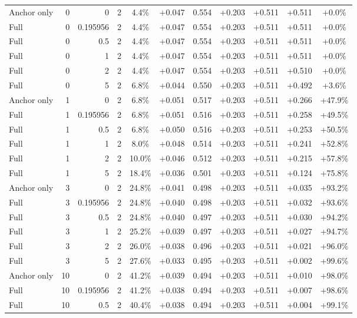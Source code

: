 \begin{table}[htbp]
\begin{tabular}{lrrrccccccc}
Anchor only & 0 & 0 & 2 & 4.4\% & +0.047 & 0.554 & +0.203 & +0.511 & +0.511 & +0.0\% \\
Full & 0 & 0.195956 & 2 & 4.4\% & +0.047 & 0.554 & +0.203 & +0.511 & +0.511 & +0.0\% \\
Full & 0 & 0.5 & 2 & 4.4\% & +0.047 & 0.554 & +0.203 & +0.511 & +0.511 & +0.0\% \\
Full & 0 & 1 & 2 & 4.4\% & +0.047 & 0.554 & +0.203 & +0.511 & +0.511 & +0.0\% \\
Full & 0 & 2 & 2 & 4.4\% & +0.047 & 0.554 & +0.203 & +0.511 & +0.510 & +0.0\% \\
Full & 0 & 5 & 2 & 6.8\% & +0.044 & 0.550 & +0.203 & +0.511 & +0.492 & +3.6\% \\
Anchor only & 1 & 0 & 2 & 6.8\% & +0.051 & 0.517 & +0.203 & +0.511 & +0.266 & +47.9\% \\
Full & 1 & 0.195956 & 2 & 6.8\% & +0.051 & 0.516 & +0.203 & +0.511 & +0.258 & +49.5\% \\
Full & 1 & 0.5 & 2 & 6.8\% & +0.050 & 0.516 & +0.203 & +0.511 & +0.253 & +50.5\% \\
Full & 1 & 1 & 2 & 8.0\% & +0.048 & 0.514 & +0.203 & +0.511 & +0.241 & +52.8\% \\
Full & 1 & 2 & 2 & 10.0\% & +0.046 & 0.512 & +0.203 & +0.511 & +0.215 & +57.8\% \\
Full & 1 & 5 & 2 & 18.4\% & +0.036 & 0.501 & +0.203 & +0.511 & +0.124 & +75.8\% \\
Anchor only & 3 & 0 & 2 & 24.8\% & +0.041 & 0.498 & +0.203 & +0.511 & +0.035 & +93.2\% \\
Full & 3 & 0.195956 & 2 & 24.8\% & +0.040 & 0.498 & +0.203 & +0.511 & +0.032 & +93.6\% \\
Full & 3 & 0.5 & 2 & 24.8\% & +0.040 & 0.497 & +0.203 & +0.511 & +0.030 & +94.2\% \\
Full & 3 & 1 & 2 & 25.2\% & +0.039 & 0.497 & +0.203 & +0.511 & +0.027 & +94.7\% \\
Full & 3 & 2 & 2 & 26.0\% & +0.038 & 0.496 & +0.203 & +0.511 & +0.021 & +96.0\% \\
Full & 3 & 5 & 2 & 27.6\% & +0.033 & 0.495 & +0.203 & +0.511 & +0.002 & +99.6\% \\
Anchor only & 10 & 0 & 2 & 41.2\% & +0.039 & 0.494 & +0.203 & +0.511 & +0.010 & +98.0\% \\
Full & 10 & 0.195956 & 2 & 41.2\% & +0.038 & 0.494 & +0.203 & +0.511 & +0.007 & +98.6\% \\
Full & 10 & 0.5 & 2 & 40.4\% & +0.038 & 0.494 & +0.203 & +0.511 & +0.004 & +99.1\% \\

\end{tabular}
\end{table}
